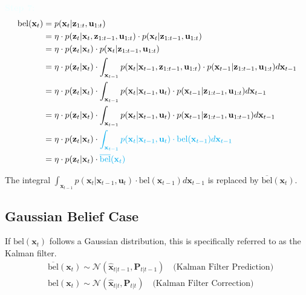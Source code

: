 \documentclass[10pt]{article}
\newcommand{\textbfazure}[1]{\textcolor{azure}{\textbf{#1}}}
\begin{document}
\textbfazure{Step 7:}
\begin{equation}
	\begin{aligned}
		\text{bel}(\mathbf{x}_{t}) & = p( \mathbf{x}_{t}  | \mathbf{z}_{1:t}, \mathbf{u}_{1:t}) \\
		& = \eta \cdot p(\mathbf{z}_{t} |  \mathbf{x}_{t}, \mathbf{z}_{1:t-1}, \mathbf{u}_{1:t}) \cdot p( \mathbf{x}_{t} | \mathbf{z}_{1:t-1}, \mathbf{u}_{1:t}) \\
		& = \eta \cdot p(\mathbf{z}_{t} |  \mathbf{x}_{t}) \cdot p( \mathbf{x}_{t} | \mathbf{z}_{1:t-1}, \mathbf{u}_{1:t}) \\
		& = \eta \cdot p(\mathbf{z}_{t} |  \mathbf{x}_{t}) \cdot \int_{\mathbf{x}_{t-1}} p( \mathbf{x}_{t} | \mathbf{x}_{t-1},\mathbf{z}_{1:t-1}, \mathbf{u}_{1:t}) \cdot p(\mathbf{x}_{t-1} | \mathbf{z}_{1:t-1}, \mathbf{u}_{1:t}) d\mathbf{x}_{t-1}\\
		& = \eta \cdot p(\mathbf{z}_{t} |  \mathbf{x}_{t}) \cdot \int_{\mathbf{x}_{t-1}} p( \mathbf{x}_{t} | \mathbf{x}_{t-1},\mathbf{u}_{t}) \cdot p(\mathbf{x}_{t-1} | \mathbf{z}_{1:t-1}, \mathbf{u}_{1:t}) d\mathbf{x}_{t-1} \\
		& = \eta \cdot p(\mathbf{z}_{t} |  \mathbf{x}_{t}) \cdot \int_{\mathbf{x}_{t-1}} p( \mathbf{x}_{t} | \mathbf{x}_{t-1},\mathbf{u}_{t}) \cdot p(\mathbf{x}_{t-1} | \mathbf{z}_{1:t-1}, \mathbf{u}_{1:t-1}) d\mathbf{x}_{t-1} \\
		& = \eta \cdot p(\mathbf{z}_{t} |  \mathbf{x}_{t}) \cdot {\color{Cyan} \int_{\mathbf{x}_{t-1}} p( \mathbf{x}_{t} | \mathbf{x}_{t-1},\mathbf{u}_{t}) \cdot \text{bel}(\mathbf{x}_{t-1}) d \mathbf{x}_{t-1} } \\
		& = \eta \cdot p(\mathbf{z}_{t} |  \mathbf{x}_{t}) \cdot  {\color{Cyan}  \overline{\text{bel}}(\mathbf{x}_{t}) }\\
	\end{aligned} 
\end{equation}

The integral $\int_{\mathbf{x}_{t-1}} p( \mathbf{x}_{t} | \mathbf{x}_{t-1},\mathbf{u}_{t}) \cdot \text{bel}(\mathbf{x}_{t-1}) d \mathbf{x}_{t-1}$ is replaced by $\overline{\text{bel}}(\mathbf{x}_{t})$.

	
	
\subsection{Gaussian Belief Case}
If $\text{bel}(\mathbf{x}_{t})$ follows a Gaussian distribution, this is specifically referred to as the Kalman filter.
\begin{equation}
	\begin{aligned}
		& \overline{\text{bel}}(\mathbf{x}_{t}) \sim \mathcal{N}(\hat{\mathbf{x}}_{t|t-1}, \mathbf{P}_{t|t-1}) \quad \text{(Kalman Filter Prediction)} \\ 
		& \text{bel}(\mathbf{x}_{t}) \sim \mathcal{N}(\hat{\mathbf{x}}_{t|t}, \mathbf{P}_{t|t}) \quad \text{(Kalman Filter Correction)}
	\end{aligned}
\end{equation}
\end{document}
